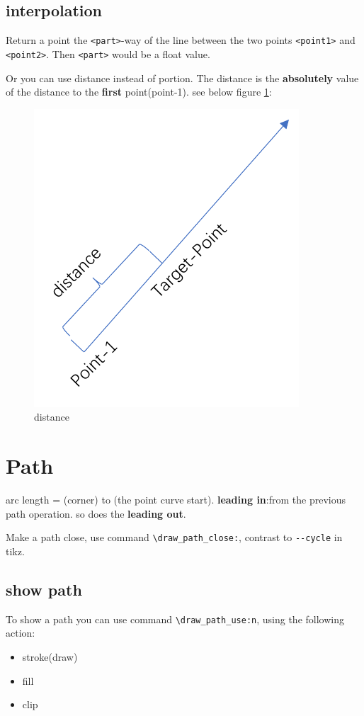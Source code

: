 \documentclass{article}
\begin{document}
\subsection{interpolation}
Return a point the \verb|<part>|-way of the line between the two points \verb|<point1>| and \verb|<point2>|.
Then \verb|<part>| would be a float value.

Or you can use distance instead of portion. The distance is the \textbf{absolutely} value of the distance
to the \textbf{first} point(point-1). see below figure \ref{fig:distance}:
\begin{figure}[!htb]
    \centering
    \includegraphics[width=.4\linewidth]{./distance.pdf}
    \caption{distance}
    \label{fig:distance}
\end{figure}




\section{Path}
arc length = (corner) to (the point curve start). \textbf{leading in}:from the previous path operation.
so does the \textbf{leading out}.

Make a path close, use command \verb|\draw_path_close:|, contrast to \verb|--cycle| in tikz.

\subsection{show path}
To show a path you can use command \verb|\draw_path_use:n|, using the following action:
\begin{itemize}
  \item stroke(draw)
  \item fill 
  \item clip
\end{itemize}
\end{document}
